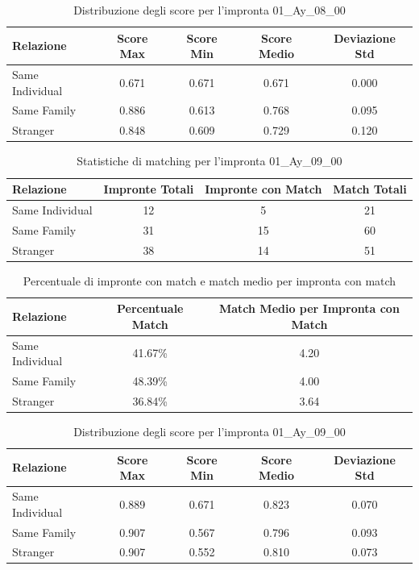 \begin{table}[htbp]
\centering
\caption{Distribuzione degli score per l'impronta 01\_Ay\_08\_00}
\label{tab:scores_01_Ay_08_00}
\begin{tabular}{|l|c|c|c|c|}
\hline
\textbf{Relazione} & \textbf{Score Max} & \textbf{Score Min} & \textbf{Score Medio} & \textbf{Deviazione Std} \\
\hline
Same Individual & 0.671 & 0.671 & 0.671 & 0.000 \\
\hline
Same Family & 0.886 & 0.613 & 0.768 & 0.095 \\
\hline
Stranger & 0.848 & 0.609 & 0.729 & 0.120 \\
\hline
\end{tabular}
\end{table}


\begin{table}[htbp]
\centering
\caption{Statistiche di matching per l'impronta 01\_Ay\_09\_00}
\label{tab:results_01_Ay_09_00}
\begin{tabular}{|l|c|c|c|}
\hline
\textbf{Relazione} & \textbf{Impronte Totali} & \textbf{Impronte con Match} & \textbf{Match Totali} \\
\hline
Same Individual & 12 & 5 & 21 \\
\hline
Same Family & 31 & 15 & 60 \\
\hline
Stranger & 38 & 14 & 51 \\
\hline
\end{tabular}
\end{table}


\begin{table}[htbp]
\centering
\caption{Percentuale di impronte con match e match medio per impronta con match}
\label{tab:match_percentage_01_Ay_09_00}
\begin{tabular}{|l|c|c|}
\hline
\textbf{Relazione} & \textbf{Percentuale Match} & \textbf{Match Medio per Impronta con Match} \\
\hline
Same Individual & 41.67\% & 4.20 \\
\hline
Same Family & 48.39\% & 4.00 \\
\hline
Stranger & 36.84\% & 3.64 \\
\hline
\end{tabular}
\end{table}


\begin{table}[htbp]
\centering
\caption{Distribuzione degli score per l'impronta 01\_Ay\_09\_00}
\label{tab:scores_01_Ay_09_00}
\begin{tabular}{|l|c|c|c|c|}
\hline
\textbf{Relazione} & \textbf{Score Max} & \textbf{Score Min} & \textbf{Score Medio} & \textbf{Deviazione Std} \\
\hline
Same Individual & 0.889 & 0.671 & 0.823 & 0.070 \\
\hline
Same Family & 0.907 & 0.567 & 0.796 & 0.093 \\
\hline
Stranger & 0.907 & 0.552 & 0.810 & 0.073 \\
\hline
\end{tabular}
\end{table}


